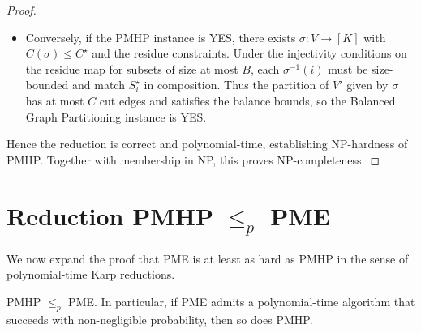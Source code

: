\documentclass[11pt]{article}
\begin{document}
\begin{proof}
\begin{itemize}
  \item Conversely, if the PMHP instance is YES, there exists $\sigma:V\to[K]$ with $C(\sigma)\le C^\star$ and the residue constraints. Under the injectivity conditions on the residue map for subsets of size at most $B$, each $\sigma^{-1}(i)$ must be size-bounded and match $S_i^\star$ in composition. Thus the partition of $V'$ given by $\sigma$ has at most $C$ cut edges and satisfies the balance bounds, so the Balanced Graph Partitioning instance is YES.
\end{itemize}

Hence the reduction is correct and polynomial-time, establishing NP-hardness of PMHP. Together with membership in NP, this proves NP-completeness.
\end{proof}

\section{Reduction PMHP $\le_p$ PME}
\label{app:pmhp-to-pme}

We now expand the proof that PME is at least as hard as PMHP in the sense of polynomial-time Karp reductions.

\begin{theorem}
\label{thm:pmhp-to-pme}
PMHP $\le_p$ PME. In particular, if PME admits a polynomial-time algorithm that succeeds with non-negligible probability, then so does PMHP.
\end{theorem}
\end{document}
